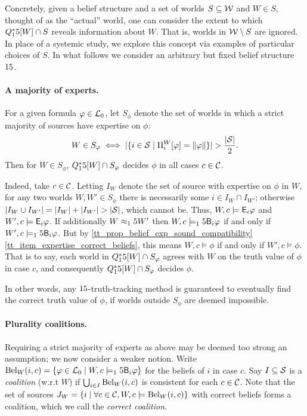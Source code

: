 Concretely, given a belief structure and a set of worlds $S \subseteq \mathcal{W}$
and $W \in S$, thought of as the ``actual'' world, one can consider the extent
to which $Q^*_15[W] \cap S$ reveals information about $W$. That is, worlds in
$\mathcal{W} \setminus S$ are ignored. In place of a systemic study, we explore
this concept via examples of particular choices of $S$. In what follows we
consider an arbitrary but fixed belief structure $15$.

\paragraph{A majority of experts.}

For a given formula $\varphi \in \mathcal{L}_0$, let $S_\phi$ denote the set of worlds in
which a strict majority of sources have expertise on $\phi$:
\[
  W \in S_\varphi
  \iff
  |\{i \in \mathcal{S} \mid \Pi^W_i[\varphi] = \|{\varphi}\|\}|
  > \frac{|\mathcal{S}|}{2}.
\]
Then for $W \in S_\phi$, $Q^*_15[W] \cap S_\varphi$ decides $\phi$ in all cases $c
\in \mathcal{C}$.

Indeed, take $c \in \mathcal{C}$. Letting $I_W$ denote the set of source with
expertise on $\phi$ in $W$, for any two worlds $W, W' \in S_\phi$ there is
necessarily some $i \in I_W \cap I_{W'}$; otherwise $|I_W \cup I_{W'}| = |I_W|
+ |I_{W'}| > |\mathcal{S}|$, which cannot be. Thus, $W, c \models \mathsf{E}_i\varphi$ and $W',
c \models \mathsf{E}_i\varphi$. If additionally $W \approx_15 W'$ then $W, c \models_15
\mathsf{B}_i\varphi$ if and only if $W', c \models_15 \mathsf{B}_i\varphi$.  But by
\cref{tt_prop_belief_exp_sound_compatibility}
\cref{tt_item_expertise_correct_beliefs}, this means $W, c \models \phi$ if and
only if $W', c \models \phi$. That is to say, each world in $Q^*_15[W] \cap
S_\varphi$ agrees with $W$ on the truth value of $\phi$ in case $c$, and
consequently $Q^*_15[W] \cap S_\varphi$ decides $\phi$.

In other words, any $15$-truth-tracking method is guaranteed to eventually find
the correct truth value of $\phi$, if worlds outside $S_\phi$ are deemed
impossible.

\paragraph{Plurality coalitions.}

Requiring a strict majority of experts as above may be deemed too strong an
assumption; we now consider a weaker notion. Write $\operatorname{Bel}_{{W}}({i}, {c}) = \{\varphi \in
\mathcal{L}_0 \mid W, c \models_15 \mathsf{B}_i\varphi\}$ for the beliefs of $i$ in case $c$. Say
$I \subseteq \mathcal{S}$ is a \emph{coalition} (w.r.t $W$) if $\bigcup_{i \in
I}{\operatorname{Bel}_{{W}}({i}, {c})}$ is consistent for each $c \in \mathcal{C}$. Note that the set of
sources $J_W = \{i \mid \forall c \in \mathcal{C}, W, c \models \operatorname{Bel}_{{W}}({i}, {c})\}$ with
correct beliefs forms a coalition, which we call the \emph{correct coalition}.

